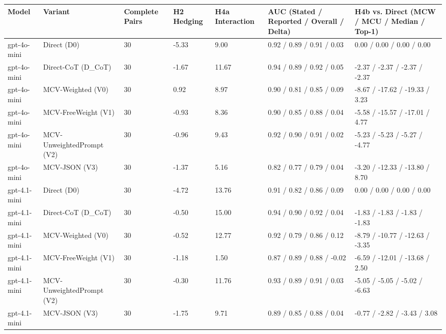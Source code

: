 \documentclass[11pt,a4paper]{article}
\begin{document}
\begin{center}\begingroup\small\setlength{\tabcolsep}{4.5pt}\renewcommand{\arraystretch}{1.12}\begin{adjustbox}{max width=\textwidth}\begin{tabular}{lllllll}\toprule
\textbf{Model} & \textbf{Variant} & \textbf{Complete Pairs} & \textbf{H2 Hedging} & \textbf{H4a Interaction} & \textbf{AUC (Stated / Reported / Overall / Delta)} & \textbf{H4b vs. Direct (MCW / MCU / Median / Top-1)} \\ \midrule
gpt-4o-mini & Direct (D0) & 30 & -5.33 & 9.00 & 0.92 / 0.89 / 0.91 / 0.03 & 0.00 / 0.00 / 0.00 / 0.00 \\
gpt-4o-mini & Direct-CoT (D\_\allowbreak{}CoT) & 30 & -1.67 & 11.67 & 0.94 / 0.89 / 0.92 / 0.05 & -2.37 / -2.37 / -2.37 / -2.37 \\
gpt-4o-mini & MCV-Weighted (V0) & 30 & 0.92 & 8.97 & 0.90 / 0.81 / 0.85 / 0.09 & -8.67 / -17.62 / -19.33 / 3.23 \\
gpt-4o-mini & MCV-FreeWeight (V1) & 30 & -0.93 & 8.36 & 0.90 / 0.85 / 0.88 / 0.04 & -5.58 / -15.57 / -17.01 / 4.77 \\
gpt-4o-mini & MCV-UnweightedPrompt (V2) & 30 & -0.96 & 9.43 & 0.92 / 0.90 / 0.91 / 0.02 & -5.23 / -5.23 / -5.27 / -4.77 \\
gpt-4o-mini & MCV-JSON (V3) & 30 & -1.37 & 5.16 & 0.82 / 0.77 / 0.79 / 0.04 & -3.20 / -12.33 / -13.80 / 8.70 \\
gpt-4.1-mini & Direct (D0) & 30 & -4.72 & 13.76 & 0.91 / 0.82 / 0.86 / 0.09 & 0.00 / 0.00 / 0.00 / 0.00 \\
gpt-4.1-mini & Direct-CoT (D\_\allowbreak{}CoT) & 30 & -0.50 & 15.00 & 0.94 / 0.90 / 0.92 / 0.04 & -1.83 / -1.83 / -1.83 / -1.83 \\
gpt-4.1-mini & MCV-Weighted (V0) & 30 & -0.52 & 12.77 & 0.92 / 0.79 / 0.86 / 0.12 & -8.79 / -10.77 / -12.63 / -3.35 \\
gpt-4.1-mini & MCV-FreeWeight (V1) & 30 & -1.18 & 1.50 & 0.87 / 0.89 / 0.88 / -0.02 & -6.59 / -12.01 / -13.68 / 2.50 \\
gpt-4.1-mini & MCV-UnweightedPrompt (V2) & 30 & -0.30 & 11.76 & 0.93 / 0.89 / 0.91 / 0.03 & -5.05 / -5.05 / -5.02 / -6.63 \\
gpt-4.1-mini & MCV-JSON (V3) & 30 & -1.75 & 9.71 & 0.89 / 0.85 / 0.88 / 0.04 & -0.77 / -2.82 / -3.43 / 3.08 \\
\bottomrule\end{tabular}\end{adjustbox}\endgroup\end{center}
\end{document}
